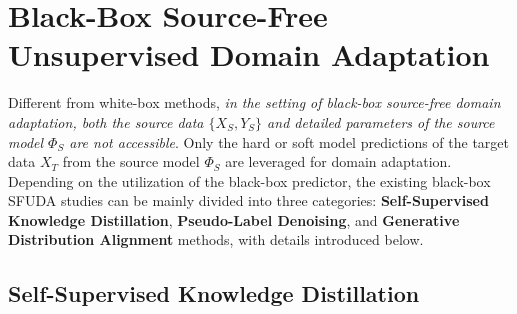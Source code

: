 \documentclass[10pt,journal,compsoc]{IEEEtran}
\begin{document}
\section{Black-Box Source-Free Unsupervised Domain Adaptation}\label{sec_black_SFUDA}
Different from white-box methods, \emph{in the setting of black-box source-free domain adaptation, both the source data $\{X_S, Y_S\}$ and detailed parameters of the source model $\Phi_S$ are not accessible}.
Only the hard or soft model predictions of the target data $X_T$ from the source model $\Phi_S$ are leveraged for domain adaptation.
Depending on the utilization of the black-box predictor, the existing black-box SFUDA studies can be mainly divided into three categories: \textbf{Self-Supervised Knowledge Distillation}, \textbf{Pseudo-Label Denoising}, and \textbf{Generative Distribution Alignment} methods, with details introduced below. %

\subsection{Self-Supervised Knowledge Distillation}


\end{document}
